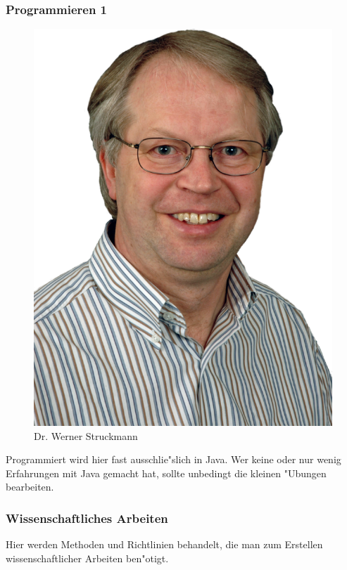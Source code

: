 \subsubsection{Programmieren 1}

\begin{figure}[h]
	\centering\includegraphics[width=0.7\linewidth]{bilder/dozenten/struck.png}\\
	{Dr. Werner Struckmann}
\end{figure}
Programmiert wird hier fast ausschlie"slich in Java. Wer keine oder nur wenig Erfahrungen mit Java gemacht hat, sollte unbedingt die kleinen "Ubungen bearbeiten.


\subsubsection{Wissenschaftliches Arbeiten}

Hier werden Methoden und Richtlinien behandelt, die man zum Erstellen
wissenschaftlicher Arbeiten ben"otigt.
